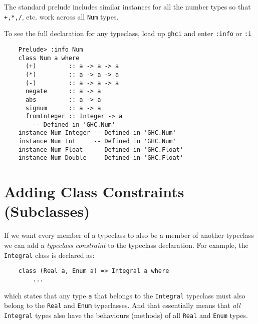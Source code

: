 The standard prelude includes similar instances for all the number types so that \texttt{+,*,/}, etc. work across all \texttt{Num} types.

To see the full declaration for any typeclass, load up \texttt{ghci} and enter \texttt{:info} or \texttt{:i}
\begin{lstlisting}
	Prelude> :info Num
    class Num a where
      (+)         :: a -> a -> a
      (*)         :: a -> a -> a
      (-)         :: a -> a -> a
      negate      :: a -> a
      abs         :: a -> a
      signum      :: a -> a
      fromInteger :: Integer -> a
        -- Defined in 'GHC.Num'
    instance Num Integer -- Defined in 'GHC.Num'
    instance Num Int     -- Defined in 'GHC.Num'
    instance Num Float   -- Defined in 'GHC.Float'
    instance Num Double  -- Defined in 'GHC.Float'
\end{lstlisting}
\section {Adding Class Constraints (Subclasses)}
If we want every member of a typeclass to also be a member of another typeclass we can add a {\em typeclass constraint} to the typeclass declaration. For example, the \texttt{Integral} class is declared as:
\begin{lstlisting}
	class (Real a, Enum a) => Integral a where
		...
\end{lstlisting}
which states that any type \texttt{a} that belongs to the \texttt{Integral} typeclass must also belong to the \texttt{Real} and \texttt{Enum} typeclasses. And that essentially means that {\em all} \texttt{Integral} types also have the behaviours (methods) of all \texttt{Real} and \texttt{Enum} types.
